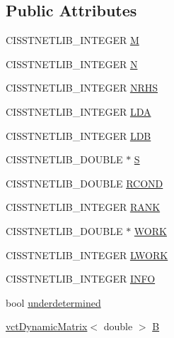 \subsection*{Public Attributes}
\begin{DoxyCompactItemize}
\item 
C\+I\+S\+S\+T\+N\+E\+T\+L\+I\+B\+\_\+\+I\+N\+T\+E\+G\+E\+R \hyperlink{classnmr_l_s_min_norm_1_1_data_ac00bf9403b20ca5890370d3e788f288e}{M}
\item 
C\+I\+S\+S\+T\+N\+E\+T\+L\+I\+B\+\_\+\+I\+N\+T\+E\+G\+E\+R \hyperlink{classnmr_l_s_min_norm_1_1_data_a840dbb98be27ad44c298d4c90eaadd1c}{N}
\item 
C\+I\+S\+S\+T\+N\+E\+T\+L\+I\+B\+\_\+\+I\+N\+T\+E\+G\+E\+R \hyperlink{classnmr_l_s_min_norm_1_1_data_a506427633858fa8b619866cbdb4ce15c}{N\+R\+H\+S}
\item 
C\+I\+S\+S\+T\+N\+E\+T\+L\+I\+B\+\_\+\+I\+N\+T\+E\+G\+E\+R \hyperlink{classnmr_l_s_min_norm_1_1_data_aa226626d2953d325f1c2738a099d5aad}{L\+D\+A}
\item 
C\+I\+S\+S\+T\+N\+E\+T\+L\+I\+B\+\_\+\+I\+N\+T\+E\+G\+E\+R \hyperlink{classnmr_l_s_min_norm_1_1_data_a9489b20db60c5e3a26941e1810cfe895}{L\+D\+B}
\item 
C\+I\+S\+S\+T\+N\+E\+T\+L\+I\+B\+\_\+\+D\+O\+U\+B\+L\+E $\ast$ \hyperlink{classnmr_l_s_min_norm_1_1_data_afee9998d9b61d300a4e9403e8189aede}{S}
\item 
C\+I\+S\+S\+T\+N\+E\+T\+L\+I\+B\+\_\+\+D\+O\+U\+B\+L\+E \hyperlink{classnmr_l_s_min_norm_1_1_data_a316a55d64f37b94fc0c15d1283cd1426}{R\+C\+O\+N\+D}
\item 
C\+I\+S\+S\+T\+N\+E\+T\+L\+I\+B\+\_\+\+I\+N\+T\+E\+G\+E\+R \hyperlink{classnmr_l_s_min_norm_1_1_data_aac550ee0b64c1eeff7d6768fe59cd946}{R\+A\+N\+K}
\item 
C\+I\+S\+S\+T\+N\+E\+T\+L\+I\+B\+\_\+\+D\+O\+U\+B\+L\+E $\ast$ \hyperlink{classnmr_l_s_min_norm_1_1_data_a1b4ef9acbf885be856123c9d0c8cd67d}{W\+O\+R\+K}
\item 
C\+I\+S\+S\+T\+N\+E\+T\+L\+I\+B\+\_\+\+I\+N\+T\+E\+G\+E\+R \hyperlink{classnmr_l_s_min_norm_1_1_data_a50a5cd5f8089b150431899161b97aa2b}{L\+W\+O\+R\+K}
\item 
C\+I\+S\+S\+T\+N\+E\+T\+L\+I\+B\+\_\+\+I\+N\+T\+E\+G\+E\+R \hyperlink{classnmr_l_s_min_norm_1_1_data_a0f96a3e574e23758c6d7e362abad201e}{I\+N\+F\+O}
\item 
bool \hyperlink{classnmr_l_s_min_norm_1_1_data_aa0ce32b53580c83249841c05d59400a9}{underdetermined}
\item 
\hyperlink{classvct_dynamic_matrix}{vct\+Dynamic\+Matrix}$<$ double $>$ \hyperlink{classnmr_l_s_min_norm_1_1_data_a315f698926b4797c974dc79b7138802a}{B}
\end{DoxyCompactItemize}


